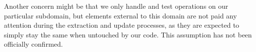 Another concern might be that we only handle and test operations on our particular subdomain, but elements external to this domain are not paid any attention during the extraction and update processes, as they are expected to simply stay the same when untouched by our code. This assumption has not been officially confirmed.







